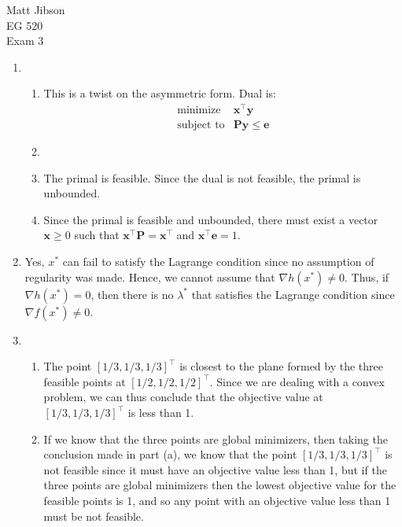 \documentclass{article}
\begin{document}
\begin{flushright}
Matt Jibson \\
EG 520 \\
Exam 3
\end{flushright}

\begin{enumerate}
	\item
		\begin{enumerate}
			\item This is a twist on the asymmetric form. Dual is:
		 		\begin{displaymath}
					\begin{array}{rl}
						\textrm{minimize} & \boldsymbol{x}^\top \boldsymbol{y} \\
						\textrm{subject to} & \boldsymbol{P} \boldsymbol{y} \le \boldsymbol{e}
					\end{array}
				\end{displaymath}
			\item %
			\item The primal is feasible. Since the dual is not feasible, the primal is unbounded.
			\item Since the primal is feasible and unbounded, there must exist a vector $\boldsymbol{x} \ge 0$ such that $\boldsymbol{x}^\top \boldsymbol{P} = \boldsymbol{x}^\top$ and $\boldsymbol{x}^\top \boldsymbol{e} = 1$.
		\end{enumerate}
	\item Yes, $x^*$ can fail to satisfy the Lagrange condition since no assumption of regularity was made. Hence, we cannot assume that $\nabla h(x^*) \ne 0$. Thus, if $\nabla h(x^*) = 0$, then there is no $\lambda^*$ that satisfies the Lagrange condition since $\nabla f(x^*) \ne 0$.
	\item
		\begin{enumerate}
			\item The point $[1/3, 1/3, 1/3]^\top$ is closest to the plane formed by the three feasible points at $[1/2, 1/2, 1/2]^\top$. Since we are dealing with a convex problem, we can thus conclude that the objective value at $[1/3, 1/3, 1/3]^\top$ is less than 1.
			\item If we know that the three points are global minimizers, then taking the conclusion made in part (a), we know that the point $[1/3, 1/3, 1/3]^\top$ is not feasible since it must have an objective value less than 1, but if the three points are global minimizers then the lowest objective value for the feasible points is 1, and so any point with an objective value less than 1 must be not feasible.

\end{enumerate}
\end{enumerate}
\end{document}
